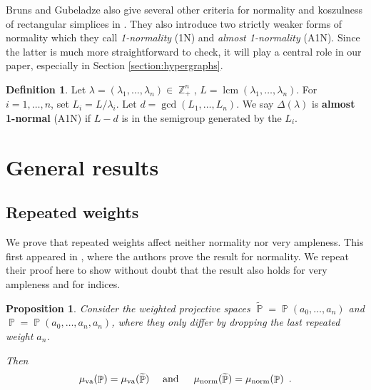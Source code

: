 \documentclass[a4paper,11pt]{amsart}
\theoremstyle{plain}
\newtheorem{proposition}[theorem]{Proposition}
\theoremstyle{definition}
\newtheorem{definition}[theorem]{Definition}
\theoremstyle{remark}
\DeclareMathOperator{\ZZ}{\mathbb{Z}}
\DeclareMathOperator{\PP}{\mathbb{P}}
\DeclareMathOperator{\lcm}{lcm}
\DeclareMathOperator{\munorm}{\mu_{\text norm}}
\DeclareMathOperator{\muva}{\mu_{\text va}}
\begin{document}
Bruns and Gubeladze also give several other criteria for normality and koszulness of rectangular simplices in \cite[Proposition 2.1, Proposition 2.4]{BrunsGubeladze:1999}. They also introduce two strictly weaker forms of normality which they call \emph{1-normality} (1N) and \emph{almost 1-normality} (A1N). Since the latter is much more straightforward to check, it will play a central role in our paper, especially in Section \ref{section:hypergraphs}.

\begin{definition}\label{definition:a1n}
    Let $\lambda = (\lambda_1, \ldots, \lambda_n) \in \ZZ_+^n$, $L = \lcm(\lambda_1, \ldots, \lambda_n)$. For $i = 1, \dots, n$, set $L_i = L/\lambda_i$. Let $d = \gcd(L_1, \ldots, L_n)$. We say $\Delta(\lambda)$ is \textbf{almost 1-normal} (A1N) if $L - d$ is in the semigroup generated by the $L_i$.
\end{definition}

\section{General results}\label{section-general-results}

\subsection{Repeated weights} \hfill

We prove that repeated weights affect neither normality nor very ampleness.
This first appeared in \cite[Lemma 2.15]{ColomenarejoGaluppiMichalek:2020}, where the authors prove the result for normality.
We repeat their proof here to show without doubt that the result also holds for very ampleness and for indices.

\begin{proposition}\label{proposition:repeated-weights}
    Consider the weighted projective spaces $\widetilde{\PP} = \PP(a_0, \dots , a_n)$ and $\PP = \PP(a_0, \dots , a_n , a_n)$, where they only differ by dropping the last repeated weight $a_n$.

    Then 
    \[\muva(\PP) = \muva(\widetilde{\PP}) \quad\text{ and }\quad \munorm(\widetilde{\PP}) = \munorm(\PP) \enspace.\]
\end{proposition}
\end{document}
